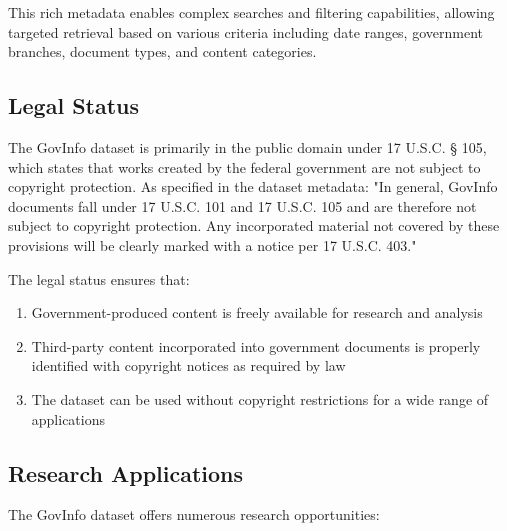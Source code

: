 This rich metadata enables complex searches and filtering capabilities, allowing targeted retrieval based on various criteria including date ranges, government branches, document types, and content categories.

\subsection{Legal Status}

The GovInfo dataset is primarily in the public domain under 17 U.S.C. § 105, which states that works created by the federal government are not subject to copyright protection. As specified in the dataset metadata: "In general, GovInfo documents fall under 17 U.S.C. 101 and 17 U.S.C. 105 and are therefore not subject to copyright protection. Any incorporated material not covered by these provisions will be clearly marked with a notice per 17 U.S.C. 403."

The legal status ensures that:

\begin{enumerate}
    \item Government-produced content is freely available for research and analysis
    \item Third-party content incorporated into government documents is properly identified with copyright notices as required by law
    \item The dataset can be used without copyright restrictions for a wide range of applications
\end{enumerate}

\subsection{Research Applications}

The GovInfo dataset offers numerous research opportunities:

